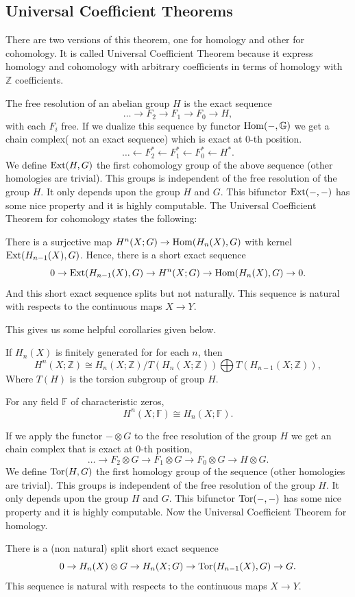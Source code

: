  	
 	\subsection{Universal Coefficient Theorems}
 	There are two versions of this theorem, one for homology and other for cohomology.
 	It is called Universal Coefficient Theorem because it express homology  and cohomology with arbitrary coefficients in terms of homology with \(\mathbb Z\) coefficients.
 	
 	The free resolution of an abelian group \(H\) is the exact sequence 
 	\[\dots \to F_2 \to F_1 \to F_0 \to H,\]
 	with each \(F_i\) free.
 	If we dualize this sequence by functor \(\operatorname{Hom}(-, \mathbb G)\) we get a chain complex( not an exact sequence) which is exact at \(0\)-th position. 
 	\[\dots \leftarrow F_2^\ast \leftarrow F_1^\ast \leftarrow F_0^\ast \leftarrow H^\ast.\]
 	We define \(\operatorname{Ext}(H,G)\) the first cohomology group of the above sequence (other homologies are trivial).
 	This groups is independent of the free resolution of the group \(H\).
 	It only depends upon the group \(H\) and \(G\).
 	This bifunctor \(\operatorname{Ext}(-,-)\) has some nice property and it is highly computable.
 	The Universal Coefficient Theorem for cohomology states the following:
 	\begin{theorem}
 		There is a surjective map \( H^n(X;G) \to \operatorname{Hom}(H_n(X),G)\) with kernel \(\operatorname{Ext}(H_{n-1}(X), G)\).
 		Hence, there is a short exact sequence 
 		\[0 \to \operatorname{Ext}(H_{n-1}(X), G) \to H^n(X;G) \to \operatorname{Hom}(H_n(X),G) \to 0.\]
 		And this short exact sequence splits but not naturally.
 		This sequence is natural with respects to the continuous maps \(X \to Y\).
 	\end{theorem}
 	
 	This gives us some helpful corollaries given below.
 	\begin{corollary}
 		If \(H_n(X)\) is finitely generated for for each \(n\), then 
 		\[H^n(X;\mathbb Z) \cong H_n(X;\mathbb Z)/T(H_n(X;\mathbb Z)) \bigoplus T(H_{n-1}(X;\mathbb Z)),\]
 		Where \(T(H)\) is the torsion subgroup of group \(H\).
 	\end{corollary}
 	\begin{corollary}
 		For any field \(\mathbb F\) of characteristic zeros, 
 		\[H^n(X;\mathbb F) \cong H_n(X;\mathbb F).\] 
 	\end{corollary}
 	
 	If we apply the functor \(- \otimes G\) to the free resolution of the group \(H\) we get an chain complex that is exact at \(0\)-th position,
 	\[\dots \to F_2 \otimes G \to F_1 \otimes G \to F_0 \otimes G \to H \otimes G.\]
 	We define \(\operatorname{Tor}(H,G)\) the first homology group of the sequence (other homologies are trivial).
 	This groups is independent of the free resolution of the group \(H\).
 	It only depends upon the group \(H\) and \(G\).
 	This bifunctor \(\operatorname{Tor}(-,-)\) has some nice property and it is highly computable.
 	Now the Universal Coefficient Theorem for homology.
 	\begin{theorem}
 		There is a (non natural) split short exact sequence 
 		\[0 \to H_n(X) \otimes G \to H_n(X;G) \to \operatorname{Tor}(H_{n-1}(X), G) \to G.\]
 		This sequence is natural with respects to the continuous maps \(X \to Y\).
 	\end{theorem}
 	
